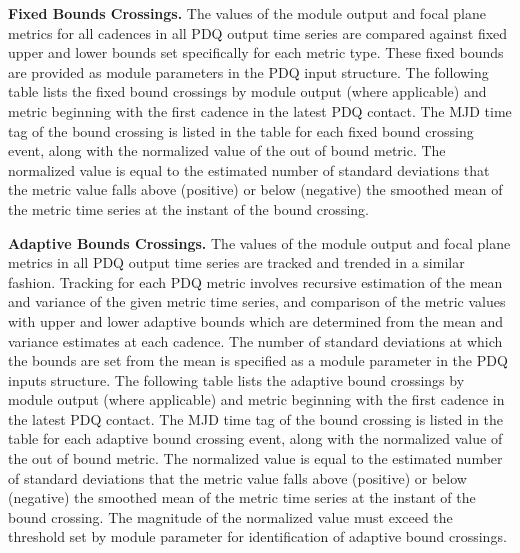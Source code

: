 {\bf Fixed Bounds Crossings.} The values of the module output and
focal plane metrics for all cadences in all PDQ output time series are
compared against fixed upper and lower bounds set specifically for
each metric type. These fixed bounds are provided as module parameters
in the PDQ input structure. The following table lists the fixed bound
crossings by module output (where applicable) and metric beginning
with the first cadence in the latest PDQ contact. The MJD time tag of
the bound crossing is listed in the table for each fixed bound
crossing event, along with the normalized value of the out of bound
metric. The normalized value is equal to the estimated number of
standard deviations that the metric value falls above (positive) or
below (negative) the smoothed mean of the metric time series at the
instant of the bound crossing.


{\bf Adaptive Bounds Crossings.} The values of the module output
and focal plane metrics in all PDQ output time series are tracked and
trended in a similar fashion. Tracking for each PDQ metric involves
recursive estimation of the mean and variance of the given metric time
series, and comparison of the metric values with upper and lower
adaptive bounds which are determined from the mean and variance
estimates at each cadence. The number of standard deviations at which
the bounds are set from the mean is specified as a module parameter in
the PDQ inputs structure. The following table lists the adaptive bound
crossings by module output (where applicable) and metric beginning
with the first cadence in the latest PDQ contact. The MJD time tag of
the bound crossing is listed in the table for each adaptive bound
crossing event, along with the normalized value of the out of bound
metric. The normalized value is equal to the estimated number of
standard deviations that the metric value falls above (positive) or
below (negative) the smoothed mean of the metric time series at the
instant of the bound crossing. The magnitude of the normalized value
must exceed the threshold set by module parameter for identification
of adaptive bound crossings.


